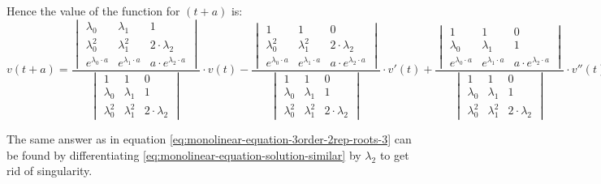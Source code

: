 \documentclass[a4paper, 11pt, oneside]{book}
\begin{document}
Hence the value of the function for $(t + a)$ is:
\begin{equation}\label{eq:monolinear-equation-3order-2rep-roots-3}
  v(t + a) = \frac{
  \begin{vmatrix}
    \lambda_0 & \lambda_1 & 1 \\
    \lambda_0^2 & \lambda_1^2 & 2 \cdot \lambda_2 \\
    e^{\lambda_0 \cdot a} & e^{\lambda_1 \cdot a} & a \cdot e^{\lambda_2 \cdot a}
  \end{vmatrix}
  }{
  \begin{vmatrix}
    1 & 1 & 0 \\
    \lambda_0 & \lambda_1 & 1 \\
    \lambda_0^2 & \lambda_1^2 & 2 \cdot \lambda_2
  \end{vmatrix}
  }
  \cdot v(t) - \frac{
  \begin{vmatrix}
    1 & 1 & 0 \\
    \lambda_0^2 & \lambda_1^2 & 2 \cdot \lambda_2 \\
    e^{\lambda_0 \cdot a} & e^{\lambda_1 \cdot a} & a \cdot e^{\lambda_2 \cdot a}
  \end{vmatrix}
  }{
  \begin{vmatrix}
    1 & 1 & 0 \\
    \lambda_0 & \lambda_1 & 1 \\
    \lambda_0^2 & \lambda_1^2 & 2 \cdot \lambda_2
  \end{vmatrix}
  }
  \cdot v'(t) + \frac{
  \begin{vmatrix}
    1 & 1 & 0 \\
    \lambda_0 & \lambda_1 & 1 \\
    e^{\lambda_0 \cdot a} & e^{\lambda_1 \cdot a} & a \cdot e^{\lambda_2 \cdot a}
  \end{vmatrix}
  }{
  \begin{vmatrix}
    1 & 1 & 0 \\
    \lambda_0 & \lambda_1 & 1 \\
    \lambda_0^2 & \lambda_1^2 & 2 \cdot \lambda_2
  \end{vmatrix}
  }
  \cdot v''(t)
\end{equation}

The same answer as in equation \ref{eq:monolinear-equation-3order-2rep-roots-3} can be found by differentiating \ref{eq:monolinear-equation-solution-similar} by $\lambda_2$ to get rid of singularity.
\end{document}
